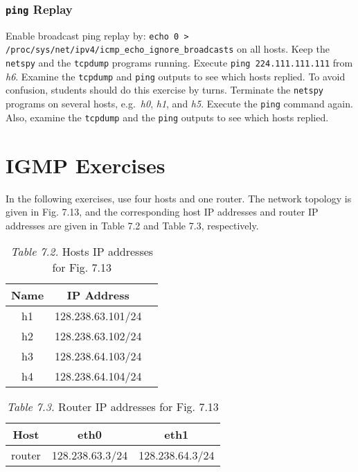 \documentclass{../UTNetLab}
\begin{document}
\section{\texttt{ping} Replay}
    Enable broadcast ping replay by: \lstinline{echo 0 > /proc/sys/net/ipv4/icmp_echo_ignore_broadcasts} on all hosts.
    Keep the \lstinline{netspy} and the \lstinline{tcpdump} programs running.
    Execute \lstinline{ping 224.111.111.111} from \textit{h6}.
    Examine the \lstinline{tcpdump} and \lstinline{ping} outputs to see which hosts replied.
    To avoid confusion, students should do this exercise by turns.
    Terminate the \lstinline{netspy} programs on several hosts, e.g.\ \textit{h0}, \textit{h1}, and \textit{h5}.
    Execute the \lstinline{ping} command again.
    Also, examine the \lstinline{tcpdump} and the \lstinline{ping} outputs to see which hosts replied.

\part{IGMP Exercises}
    In the following exercises, use four hosts and one router. The network topology is given in Fig. 7.13, and the corresponding host IP addresses and router IP addresses are given in Table 7.2 and Table 7.3, respectively.

    \begin{table}[H]
        \caption{\textit{Table 7.2.} Hosts IP addresses for Fig. 7.13}
        \label{tbl:7.2}
        \centering
        \begin{tabular}{ *3c }
            \hline \hline
            Name & IP Address \\
            \hline
                h1 & 128.238.63.101/24 \\
                h2 & 128.238.63.102/24 \\
                h3 & 128.238.64.103/24 \\
                h4 & 128.238.64.104/24 \\
            \hline \hline
            \end{tabular}
    \end{table}

    \begin{table}[H]
        \caption{\textit{Table 7.3.} Router IP addresses for Fig. 7.13}
        \label{tbl:7.3}
        \centering
        \begin{tabular}{ *3c }
            \hline \hline
            Host & eth0 & eth1 \\
            \hline
            router & 128.238.63.3/24 & 128.238.64.3/24 \\
            \hline \hline
            \end{tabular}
    \end{table}
\end{document}

